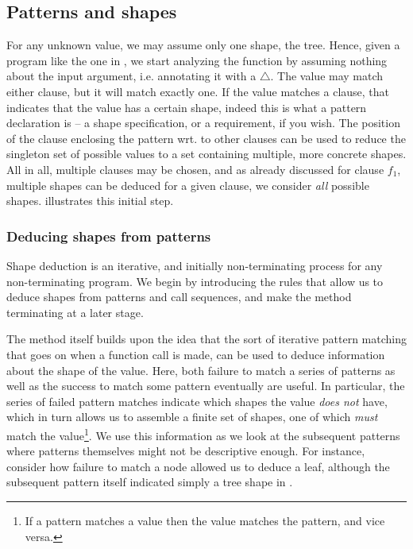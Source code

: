 \subsection{Patterns and shapes}


For any unknown value, we may assume only one shape, the tree. Hence, given a
program like the one in , we start analyzing
the function  by assuming nothing about the input argument, i.e.
annotating it with a $\bigtriangleup$. The value may match either clause, but
it will match exactly one. If the value matches a clause, that indicates that
the value has a certain shape, indeed this is what a pattern declaration is --
a shape specification, or a requirement, if you wish. The position of the
clause enclosing the pattern wrt. to other clauses can be used to reduce the
singleton set of possible values to a set containing multiple, more concrete
shapes. All in all, multiple clauses may be chosen, and as already discussed
for clause $f_1$, multiple shapes can be deduced for a given clause, we
consider \emph{all} possible shapes.
 illustrates this initial step.


\subsubsection{Deducing shapes from patterns}

Shape deduction is an iterative, and initially non-terminating process for any
non-terminating program. We begin by introducing the rules that allow us to
deduce shapes from patterns and call sequences, and make the method terminating
at a later stage.

The method itself builds upon the idea that the sort of iterative pattern
matching that goes on when a function call is made, can be used to deduce
information about the shape of the value. Here, both failure to match a series
of patterns as well as the success to match some pattern eventually are useful.
In particular, the series of failed pattern matches indicate which shapes the
value \emph{does not} have, which in turn allows us to assemble a finite set of
shapes, one of which \emph{must} match the value\footnote{If a pattern matches
a value then the value matches the pattern, and vice versa.}. We use this
information as we look at the subsequent patterns where patterns themselves
might not be descriptive enough. For instance, consider how failure to match a
node allowed us to deduce a leaf, although the subsequent pattern itself
indicated simply a tree shape in .

